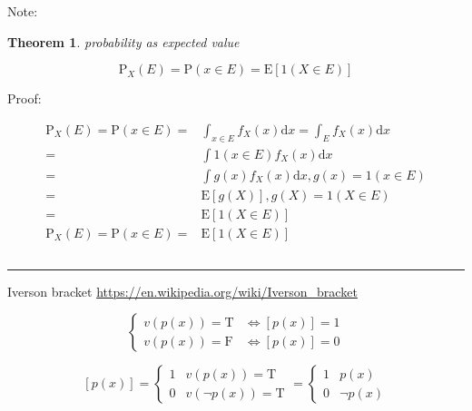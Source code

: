 \documentclass[
]{book}
\newtheorem{theorem}{Theorem}[chapter]
\theoremstyle{definition}
\theoremstyle{definition}
\theoremstyle{definition}
\theoremstyle{definition}
\theoremstyle{remark}
\begin{document}
Note:

\begin{theorem}
\protect\hypertarget{thm:unnamed-chunk-23}{}\label{thm:unnamed-chunk-23}probability as expected value
\end{theorem}

\[
\mathrm{P}_{{\scriptscriptstyle X}}\left(E\right)=\mathrm{P}\left(x\in E\right)=\mathrm{E}\left[1\left(X\in E\right)\right]
\]

Proof:

\[
\begin{aligned}
\mathrm{P}_{{\scriptscriptstyle X}}\left(E\right)=\mathrm{P}\left(x\in E\right)= & \int_{x\in E}f_{{\scriptscriptstyle X}}\left(x\right)\mathrm{d}x=\int_{E}f_{{\scriptscriptstyle X}}\left(x\right)\mathrm{d}x\\
= & \int1\left(x\in E\right)f_{{\scriptscriptstyle X}}\left(x\right)\mathrm{d}x\\
= & \int g\left(x\right)f_{{\scriptscriptstyle X}}\left(x\right)\mathrm{d}x,g\left(x\right)=1\left(x\in E\right)\\
= & \mathrm{E}\left[g\left(X\right)\right],g\left(X\right)=1\left(X\in E\right)\\
= & \mathrm{E}\left[1\left(X\in E\right)\right]\\
\mathrm{P}_{{\scriptscriptstyle X}}\left(E\right)=\mathrm{P}\left(x\in E\right)= & \mathrm{E}\left[1\left(X\in E\right)\right]
\end{aligned}
\]

\[
\tag*{$\Box$}
\]

\begin{center}\rule{0.5\linewidth}{0.5pt}\end{center}

Iverson bracket \url{https://en.wikipedia.org/wiki/Iverson_bracket}

\[
\begin{cases}
v\left(p\left(x\right)\right)=\mathrm{T} & \Leftrightarrow\left[p\left(x\right)\right]=1\\
v\left(p\left(x\right)\right)=\mathrm{F} & \Leftrightarrow\left[p\left(x\right)\right]=0
\end{cases}
\]

\[
\left[p\left(x\right)\right]=\begin{cases}
1 & v\left(p\left(x\right)\right)=\mathrm{T}\\
0 & v\left(\neg p\left(x\right)\right)=\mathrm{T}
\end{cases}=\begin{cases}
1 & p\left(x\right)\\
0 & \neg p\left(x\right)
\end{cases}
\]
\end{document}
